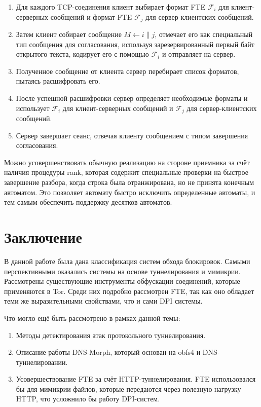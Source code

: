 \begin{enumerate}
    \item Для каждого TCP-соединения клиент выбирает формат FTE $\mathcal{F}_i$ для клиент-серверных сообщений и формат FTE $\mathcal{F}_j$ для сервер-клиентских сообщений.
    \item Затем клиент собирает сообщение $M \leftarrow i \| j$, отмечает его как специальный тип сообщения для согласования,
          используя зарезервированный первый байт открытого текста, кодирует его с помощью $\mathcal{F}_i$ и отправляет на сервер.
    \item Полученное сообщение от клиента сервер перебирает список форматов, пытаясь расшифровать его.
    \item После успешной расшифровки сервер определяет необходимые форматы и использует $\mathcal{F}_i$
          для клиент-серверных сообщений и $\mathcal{F}_j$ для сервер-клиентских сообщений.
    \item Сервер завершает сеанс, отвечая клиенту сообщением с типом завершения согласования.
\end{enumerate}

Можно усовершенствовать обычную реализацию на стороне приемника за счёт наличия процедуры rank,
которая содержит специальные проверки на быстрое завершение разбора, когда строка была отранжирована, но не принята конечным автоматом.
Это позволяет автомату быстро исключить определенные автоматы, и тем самым обеспечить поддержку десятков автоматов.

\section{Заключение}

В данной работе была дана классификация систем обхода блокировок. Самыми перспективными оказались системы на основе туннелирования и мимикрии.
Рассмотрены существующие инструменты обфускации соединений, которые применяются в Tor. Среди них подробно рассмотрен FTE,
так как оно обладает теми же выразительными свойствами, что и сами DPI системы.

Что могло ещё быть рассмотрено в рамках данной темы:
\begin{enumerate}
    \item Методы детектирования атак протокольного туннелирования.
    \item Описание работы DNS-Morph, который основан на obfs4 и DNS-туннелировании.
    \item Усовершествование FTE за счёт HTTP-туннелирования. FTE использовался бы для мимикрии файлов,
          которые передаются через полезную нагрузку HTTP, что усложнило бы работу DPI-систем.
\end{enumerate}

